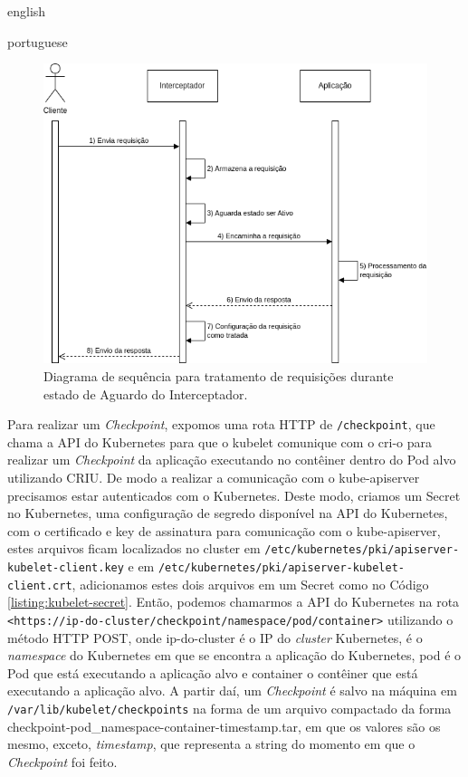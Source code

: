 \begin{otherlanguage*}{english}
\begin{otherlanguage*}{portuguese}
\begin{figure}[h]
\centering
\includegraphics[scale=0.64]{images/wait-state.png}
\caption{Diagrama de sequência para tratamento de requisições durante estado de Aguardo do Interceptador.}
\label{fig:diagram-wait-state-interceptor}
\end{figure}

Para realizar um \textit{Checkpoint}, expomos uma rota HTTP de \texttt{/checkpoint}, que
chama a API do Kubernetes para que o kubelet comunique com o cri-o para realizar um 
\textit{Checkpoint} da aplicação executando no contêiner dentro do Pod alvo utilizando
CRIU. De modo a realizar a comunicação com o kube-apiserver precisamos estar autenticados
com o Kubernetes. Deste modo, criamos um Secret no Kubernetes, uma configuração de segredo
disponível na API do Kubernetes, com o certificado e key de assinatura para comunicação
com o kube-apiserver, estes arquivos ficam localizados no cluster em
\texttt{/etc/kubernetes/pki/apiserver-kubelet-client.key} e em
\texttt{/etc/kubernetes/pki/apiserver-kubelet-client.crt}, adicionamos estes dois arquivos em um
Secret como no Código \ref{listing:kubelet-secret}. Então, podemos chamarmos a API
do Kubernetes na rota \texttt{<https://ip-do-cluster/checkpoint/namespace/pod/container>}
utilizando o método HTTP POST, onde ip-do-cluster é o IP do \textit{cluster} Kubernetes,
é o \textit{namespace} do Kubernetes em que se encontra a aplicação do Kubernetes, pod é
o Pod que está executando a aplicação alvo e container o contêiner que está executando a
aplicação alvo. A partir daí, um \textit{Checkpoint} é salvo na máquina em
\texttt{/var/lib/kubelet/checkpoints} na forma de um arquivo compactado da forma
checkpoint-pod\_namespace-container-timestamp.tar, em que os valores são os mesmo,
exceto, \textit{timestamp}, que representa a string do momento em que o \textit{Checkpoint}
foi feito.


\end{otherlanguage*}
\end{otherlanguage*}
